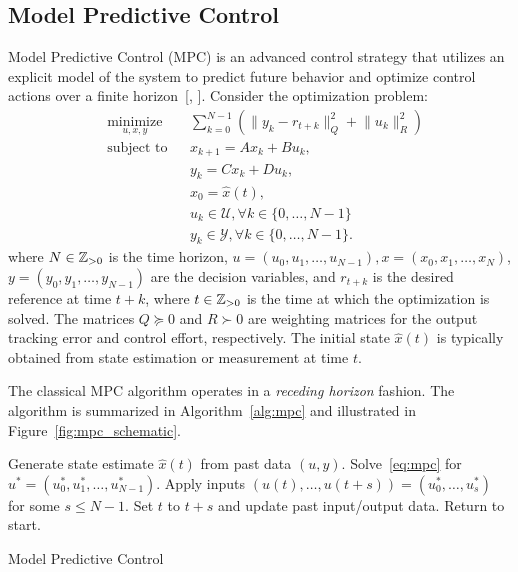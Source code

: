 \subsection{Model Predictive Control}\label{sec:mpc}
Model Predictive Control (MPC) is an advanced control strategy that utilizes an explicit model of the system to predict future behavior and optimize control actions over a finite horizon~[\cite{camacho2007}, \cite{ferramosca2009}]. Consider the optimization problem:
\begin{equation}\label{eq:mpc}
    \begin{aligned}
        & \underset{u,x,y}{\text{minimize}} && \sum_{k=0}^{N-1} \left( \lVert y_k - r_{t+k} \rVert_Q^2 + \lVert u_k \rVert_R^2 \right) \\
        & \text{subject to} && x_{k+1} = A x_k + B u_k, \\
        & && y_k = C x_k + D u_k, \\
        & && x_0 = \hat{x}(t), \\
        & && u_k \in \mathcal{U}, \forall k \in \{0, \ldots, N-1\} \\
        & && y_k \in \mathcal{Y}, \forall k \in \{0, \ldots, N-1\}.
    \end{aligned}
\end{equation}
where $N \in \mathbb{Z}_{> 0}$ is the time horizon, $u = (u_0, u_1, \ldots, u_{N-1}), x = (x_0, x_1, \ldots, x_N)$, $y = (y_0, y_1, \ldots, y_{N-1})$ are the decision variables, and $r_{t+k}$ is the desired reference at time $t+k$, where $t \in \mathbb{Z}_{>0}$ is the time at which the optimization is solved. The matrices $Q \succeq 0$ and $R \succ 0$ are weighting matrices for the output tracking error and control effort, respectively. The initial state $\hat{x}(t)$ is typically obtained from state estimation or measurement at time $t$.

The classical MPC algorithm operates in a \emph{receding horizon} fashion. The algorithm is summarized in Algorithm~\ref{alg:mpc} and illustrated in Figure~\ref{fig:mpc_schematic}.

\begin{algorithm}[H]
    \BlankLine
        Generate state estimate $\hat{x}(t)$ from past data $(u,y)$.\;
        Solve~\eqref{eq:mpc} for $u^* = (u_0^*, u_1^*, \ldots, u_{N-1}^*)$.\;
        Apply inputs $(u(t), \ldots, u(t+s)) = (u^*_0, \ldots, u^*_s)$ for some $s \leq N-1$.\;
  	    Set $t$ to $t+s$ and update past input/output data.\;
        Return to start.
    \caption{Model Predictive Control}
    \label{alg:mpc}
\end{algorithm}

